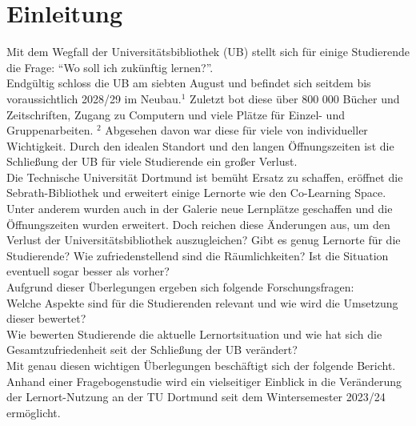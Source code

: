 \documentclass[11pt, a4paper]{article}
\begin{document}
\section{Einleitung}
\label{Einleitung}
Mit dem Wegfall der Universitätsbibliothek (UB) stellt sich für einige Studierende die Frage: “Wo soll ich zukünftig lernen?”.\\
Endgültig schloss die UB am siebten August und befindet sich seitdem bis voraussichtlich 2028/29 im Neubau.\hyperref[seitenverweis]{$^1$} Zuletzt bot diese über 800 000 Bücher und Zeitschriften, Zugang zu Computern und viele Plätze für Einzel- und Gruppenarbeiten. \hyperref[seitenverweis]{$^2$} Abgesehen davon war diese für viele von individueller Wichtigkeit.
Durch den idealen Standort und den langen Öffnungszeiten ist die Schließung der UB für viele Studierende ein großer Verlust.\\
Die Technische Universität Dortmund ist bemüht Ersatz zu schaffen, eröffnet die Sebrath-Bibliothek und erweitert einige Lernorte wie den Co-Learning Space.
Unter anderem wurden auch in der Galerie neue Lernplätze geschaffen und die Öffnungszeiten wurden erweitert.
Doch reichen diese Änderungen aus, um den Verlust der Universitätsbibliothek auszugleichen?
Gibt es genug Lernorte für die Studierende? Wie zufriedenstellend sind die Räumlichkeiten? Ist die Situation eventuell sogar besser als vorher?\\

\vspace{-0.2cm}
Aufgrund dieser Überlegungen ergeben sich folgende Forschungsfragen:\\
Welche Aspekte sind für die Studierenden relevant und wie wird die Umsetzung dieser bewertet?\\
Wie bewerten Studierende die aktuelle Lernortsituation und wie hat sich die Gesamtzufriedenheit seit der Schließung der UB verändert?\\
Mit genau diesen wichtigen Überlegungen beschäftigt sich der folgende Bericht.
Anhand einer Fragebogenstudie wird ein vielseitiger Einblick in die Veränderung der Lernort-Nutzung an der TU Dortmund seit dem Wintersemester 2023/24 ermöglicht.
\end{document}
